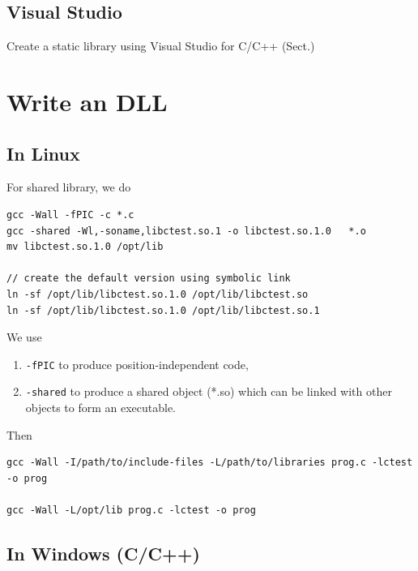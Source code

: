 \subsection{Visual Studio}

Create a static library using Visual Studio for C/C++ (Sect.)



\section{Write an DLL}

\subsection{In Linux}

For shared library, we do
\begin{verbatim}
gcc -Wall -fPIC -c *.c
gcc -shared -Wl,-soname,libctest.so.1 -o libctest.so.1.0   *.o
mv libctest.so.1.0 /opt/lib

// create the default version using symbolic link
ln -sf /opt/lib/libctest.so.1.0 /opt/lib/libctest.so
ln -sf /opt/lib/libctest.so.1.0 /opt/lib/libctest.so.1
\end{verbatim}

We use 
\begin{enumerate}
  \item \verb!-fPIC! to produce position-independent code, 

  \item  \verb!-shared! to produce a shared object (*.so) which can be linked with
  other objects to form an executable.

\end{enumerate}

Then
\begin{verbatim}
gcc -Wall -I/path/to/include-files -L/path/to/libraries prog.c -lctest -o prog

gcc -Wall -L/opt/lib prog.c -lctest -o prog

\end{verbatim}


\subsection{In Windows (C/C++)}
\label{sec:__declspec(dllexport)}

